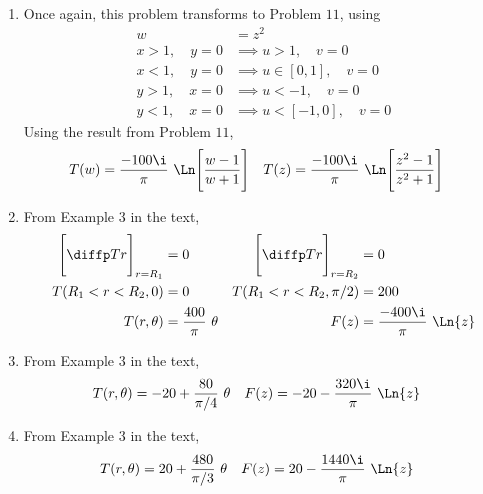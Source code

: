\begin{enumerate}
    \item Once again, this problem transforms to Problem $ 11 $, using
          \begin{align}
              w                  & = z^2                              \\
              x > 1, \quad y = 0 & \implies u > 1, \quad v = 0        \\
              x < 1, \quad y = 0 & \implies u \in [0, 1], \quad v = 0 \\
              y > 1, \quad x = 0 & \implies u < -1, \quad v = 0       \\
              y < 1, \quad x = 0 & \implies u < [-1, 0], \quad v = 0
          \end{align}
          Using the result from Problem $ 11 $,
          \begin{align}
              T(w) & = \frac{-100\i}{\pi}\ \Ln\Bigg[\frac{w-1}{w+1}\Bigg]     &
              T(z) & = \frac{-100\i}{\pi}\ \Ln\Bigg[\frac{z^2-1}{z^2+1}\Bigg]
          \end{align}

    \item From Example $ 3 $ in the text,
          \begin{align}
              \Bigg[ \diffp Tr \Bigg]_{r = R_1} & = 0                           &
              \Bigg[ \diffp Tr \Bigg]_{r = R_2} & = 0                             \\
              T(R_1<r<R_2, 0)                   & = 0                           &
              T(R_1<r<R_2, \pi/2)               & = 200                           \\
              T(r, \theta)                      & = \frac{400}{\pi}\ \theta     &
              F(z)                              & = \frac{-400 \i}{\pi}\ \Ln{z}
          \end{align}

    \item From Example $ 3 $ in the text,
          \begin{align}
              T(r, \theta) & = -20 + \frac{80}{\pi/4}\ \theta   &
              F(z)         & = -20 - \frac{320 \i}{\pi}\ \Ln{z}
          \end{align}

    \item From Example $ 3 $ in the text,
          \begin{align}
              T(r, \theta) & = 20 + \frac{480}{\pi/3}\ \theta   &
              F(z)         & = 20 - \frac{1440 \i}{\pi}\ \Ln{z}
          \end{align}


\end{enumerate}
